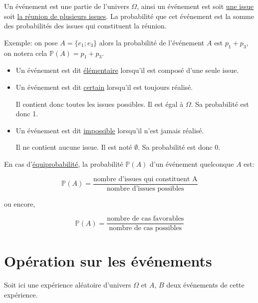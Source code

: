 \documentclass[french]{book}
\begin{document}
\begin{defn}
Un événement est une partie de l'univers $\Omega$, ainsi un événement est soit \underline{une issue} soit \underline{la réunion de plusieurs issues}. 
La probabilité que cet événement est la somme des probabilités des issues qui constituent la réunion.
\end{defn}

Exemple: on pose $A=\{ e_1 ; e_3 \}$  alors la probabilité de l'événement $A$ est $p_1+p_3$, on notera cela $\mathbb{P}(A)=p_1+p_3$.

\begin{defn}
\begin{itemize}


\item Un événement est dit \underline{élémentaire} lorsqu'il est composé d'une seule issue.
\item Un événement est dit \underline{certain} lorsqu'il est toujours réalisé. 

Il contient donc toutes les issues possibles. Il est égal à $\Omega$. Sa probabilité est donc 1.
\item Un événement est dit \underline{impossible} lorsqu'il n'est jamais réalisé. 

Il ne contient aucune issue. Il est noté $\emptyset$.  Sa probabilité est donc 0.

\end{itemize}
\end{defn}

\begin{prop}
En cas d'\underline{équiprobabilité}, la probabilité $\mathbb{P}(A)$ d'un événement quelconque $A$ est: 

$$\mathbb{P}(A)=\frac{\text{nombre d'issues qui constituent A}}{\text{nombre d'issues possibles}}$$

ou encore,

$$\mathbb{P}(A)=\frac{\text{nombre de cas favorables}}{\text{nombre de cas possibles}}$$
\end{prop}

\section{Opération sur les événements}
Soit ici une expérience aléatoire d'univers $\Omega$ et $A$, $B$ deux événements de cette expérience.
\end{document}
